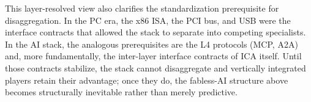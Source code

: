 This layer-resolved view also clarifies the standardization prerequisite for disaggregation. In the PC era, the x86 ISA, the PCI bus, and USB were the interface contracts that allowed the stack to separate into competing specialists. In the AI stack, the analogous prerequisites are the L4 protocols (MCP, A2A) and, more fundamentally, the inter-layer interface contracts of ICA itself. Until those contracts stabilize, the stack cannot disaggregate and vertically integrated players retain their advantage; once they do, the fabless-AI structure above becomes structurally inevitable rather than merely predictive.
